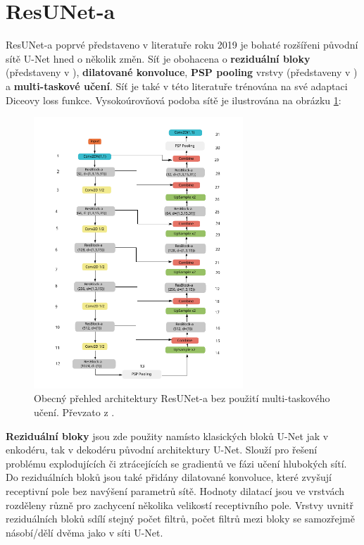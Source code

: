 \section{ResUNet-a}
\label{sec:Chapter25}

ResUNet-a poprvé představeno v literatuře \cite{resuneta} roku 2019 je bohaté rozšířeni původní sítě U-Net hned o několik změn. Síť je obohacena o \textbf{reziduální bloky} (představeny v \cite{residualblocks}), \textbf{dilatované konvoluce}, \textbf{PSP pooling} vrstvy (představeny v \cite{psp}) a \textbf{multi-taskové učení}. Síť je také v této literatuře trénována na své adaptaci Diceovy loss funkce. Vysokoúrovňová podoba sítě je ilustrována na obrázku \ref{fig:resuneta_overview}:

\begin{figure}[H]
\centering
\includegraphics[width=0.7\textwidth,keepaspectratio]{Figures/resuneta_overview.pdf}
\caption[Obecný přehled architektury ResUNet-a]{Obecný přehled architektury ResUNet-a bez použití multi-taskového učení. Převzato z \cite{resuneta}. }
\label{fig:resuneta_overview}
\end{figure}

\textbf{Reziduální bloky} jsou zde použity namísto klasických bloků U-Net jak v enkodéru, tak v dekodéru původní architektury U-Net. Slouží pro řešení problému explodujících či ztrácejících se gradientů ve fázi učení hlubokých sítí. Do reziduálních bloků jsou také přidány dilatované konvoluce, které zvyšují receptivní pole bez navýšení parametrů sítě. Hodnoty dilatací jsou ve vrstvách rozděleny různě pro zachycení několika velikostí receptivního pole. Vrstvy uvnitř reziduálních bloků sdílí stejný počet filtrů, počet filtrů mezi bloky se samozřejmě násobí/dělí dvěma jako v síti U-Net.

